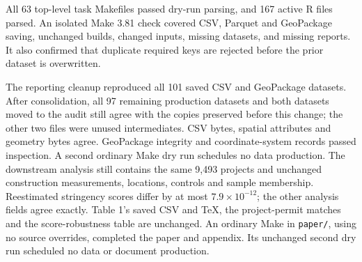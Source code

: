 All 63 top-level task Makefiles passed dry-run parsing, and 167 active R files
parsed. An isolated Make 3.81 check covered CSV, Parquet and GeoPackage saving,
unchanged builds, changed inputs, missing datasets, and missing reports. It
also confirmed that duplicate required keys are rejected before the prior
dataset is overwritten.

The reporting cleanup reproduced all 101 saved CSV and GeoPackage datasets.
After consolidation, all 97 remaining production datasets and both datasets
moved to the audit still agree with the copies preserved before this change;
the other two files were unused intermediates. CSV bytes, spatial attributes
and geometry bytes agree. GeoPackage integrity and coordinate-system records
passed inspection. A second ordinary Make dry run schedules no data production.
The downstream analysis still contains the same 9,493 projects and
unchanged construction measurements, locations, controls and sample membership.
Reestimated stringency scores differ by at most $7.9\times 10^{-12}$; the other
analysis fields agree exactly. Table 1's saved CSV and TeX, the project-permit
matches and the score-robustness table are unchanged. An ordinary Make in
\texttt{paper/}, using no source overrides, completed the paper and appendix.
Its unchanged second dry run scheduled no data or document production.
